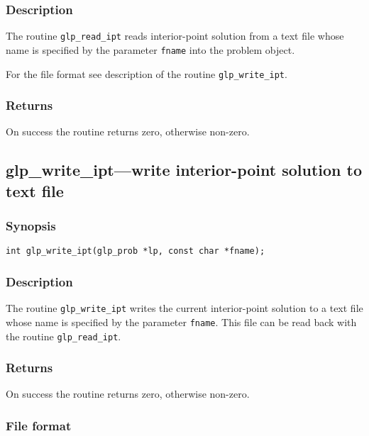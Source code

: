 \subsubsection*{Description}

The routine \verb|glp_read_ipt| reads interior-point solution from a
text file whose name is specified by the parameter \verb|fname| into the
problem object.

For the file format see description of the routine \verb|glp_write_ipt|.

\subsubsection*{Returns}

On success the routine returns zero, otherwise non-zero.

\subsection{glp\_write\_ipt---write interior-point solution to text
file}

\subsubsection*{Synopsis}

\begin{verbatim}
int glp_write_ipt(glp_prob *lp, const char *fname);
\end{verbatim}

\subsubsection*{Description}

The routine \verb|glp_write_ipt| writes the current interior-point
solution to a text file whose name is specified by the parameter
\verb|fname|. This file can be read back with the routine
\verb|glp_read_ipt|.

\subsubsection*{Returns}

On success the routine returns zero, otherwise non-zero.

\subsubsection*{File format}

